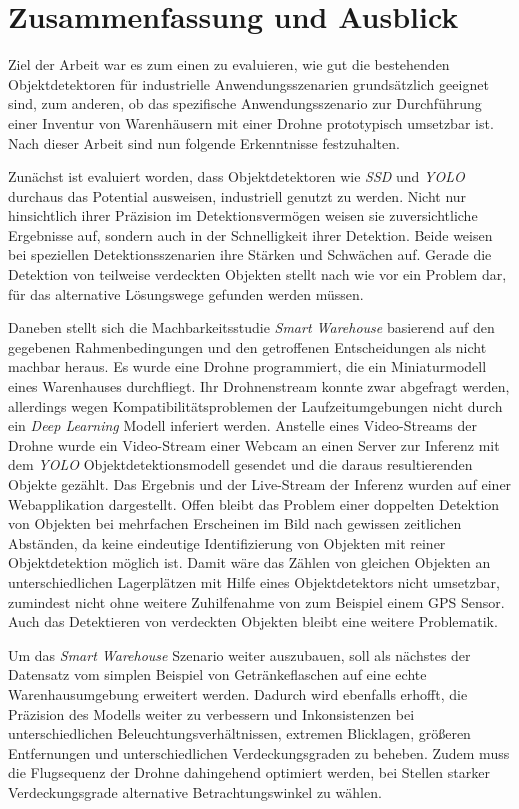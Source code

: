\chapter{Zusammenfassung und Ausblick}

Ziel der Arbeit war es zum einen zu evaluieren, wie gut die bestehenden Objektdetektoren für industrielle Anwendungsszenarien grundsätzlich geeignet sind, zum anderen, ob das spezifische Anwendungsszenario zur Durchführung einer Inventur von Warenhäusern mit einer Drohne prototypisch umsetzbar ist. Nach dieser Arbeit sind nun folgende Erkenntnisse festzuhalten.

Zunächst ist evaluiert worden, dass Objektdetektoren wie \textit{SSD} und \textit{YOLO} durchaus das Potential ausweisen, industriell genutzt zu werden. Nicht nur hinsichtlich ihrer Präzision im Detektionsvermögen weisen sie zuversichtliche Ergebnisse auf, sondern auch in der Schnelligkeit ihrer Detektion. Beide weisen bei speziellen Detektionsszenarien ihre Stärken und Schwächen auf. Gerade die Detektion von teilweise verdeckten Objekten stellt nach wie vor ein Problem dar, für das alternative Lösungswege gefunden werden müssen. 

Daneben stellt sich die Machbarkeitsstudie \textit{Smart Warehouse} basierend auf den gegebenen Rahmenbedingungen und den getroffenen Entscheidungen als nicht machbar heraus. Es wurde eine Drohne programmiert, die ein Miniaturmodell eines Warenhauses durchfliegt. Ihr Drohnenstream konnte zwar abgefragt werden, allerdings wegen Kompatibilitätsproblemen der Laufzeitumgebungen nicht durch ein \textit{Deep Learning} Modell inferiert werden. Anstelle eines Video-Streams der Drohne wurde ein Video-Stream einer Webcam an einen Server zur Inferenz mit dem \textit{YOLO} Objektdetektionsmodell gesendet und die daraus resultierenden Objekte gezählt. Das Ergebnis und der Live-Stream der Inferenz wurden auf einer Webapplikation dargestellt. Offen bleibt das Problem einer doppelten Detektion von Objekten bei mehrfachen Erscheinen im Bild nach gewissen zeitlichen Abständen, da keine eindeutige Identifizierung von Objekten mit reiner Objektdetektion möglich ist. Damit wäre das Zählen von gleichen Objekten an unterschiedlichen Lagerplätzen mit Hilfe eines Objektdetektors nicht umsetzbar, zumindest nicht ohne weitere Zuhilfenahme von zum Beispiel einem GPS Sensor. Auch das Detektieren von verdeckten Objekten bleibt eine weitere Problematik.

Um das \textit{Smart Warehouse} Szenario weiter auszubauen, soll als nächstes der Datensatz vom simplen Beispiel von Getränkeflaschen auf eine echte Warenhausumgebung erweitert werden. Dadurch wird ebenfalls erhofft, die Präzision des Modells weiter zu verbessern und Inkonsistenzen bei unterschiedlichen Beleuchtungsverhältnissen, extremen Blicklagen, größeren Entfernungen und unterschiedlichen Verdeckungsgraden zu beheben. Zudem muss die Flugsequenz der Drohne dahingehend optimiert werden, bei Stellen starker Verdeckungsgrade alternative Betrachtungswinkel zu wählen. 


